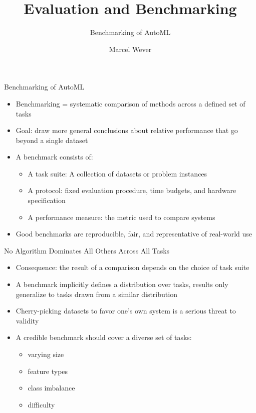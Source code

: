 \documentclass[main]{subfiles}
\title[Evaluation and Benchmarking]{Evaluation and Benchmarking}
\subtitle{Benchmarking of AutoML}
\author[Marcel Wever]{Marcel Wever}
\date{}
\begin{document}
	
	\maketitle
	

\begin{frame}[c]{Benchmarking of AutoML}
\begin{itemize}
    \item Benchmarking = systematic comparison of methods across a defined set of tasks
    \item Goal: draw more general conclusions about relative performance that go beyond a single dataset
    \item A benchmark consists of:
    \begin{itemize}
        \item A task suite: A collection of datasets or problem instances
        \item A protocol: fixed evaluation procedure, time budgets, and hardware specification
        \item A performance measure: the metric used to compare systems
    \end{itemize}
    \item Good benchmarks are reproducible, fair, and representative of real-world use
\end{itemize}
\end{frame}

\begin{frame}{No Algorithm Dominates All Others Across All Tasks}
    \begin{itemize}
        \item Consequence: the result of a comparison depends on the choice of task suite
        \item A benchmark implicitly defines a distribution over tasks, results only generalize to tasks drawn from a similar distribution
        \item \alert{Cherry-picking datasets} to favor one's own system is a serious threat to validity
        \item A credible benchmark should cover a diverse set of tasks:
        \begin{itemize}
            \item varying size
            \item feature types
            \item class imbalance
            \item difficulty
        \end{itemize}
    \end{itemize}
\end{frame}
\end{document}
